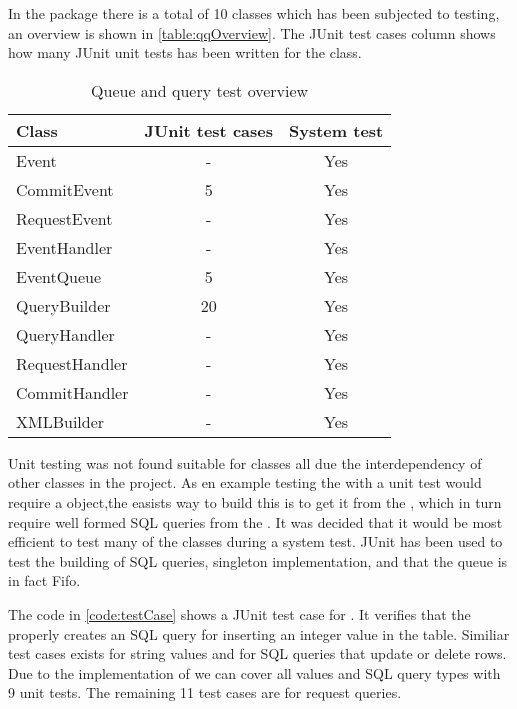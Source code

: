 In the  package there is a total of 10 classes which has been subjected to testing, an overview is shown in \autoref{table:qqOverview}.
The JUnit test cases column shows how many JUnit unit tests has been written for the class.

\begin{table}[H]
  \begin{center}
  \begin{tabular}{l|c|c}
    Class          & JUnit test cases & System test\\
\hline
    Event          & -                &Yes\\
    CommitEvent    & 5                &Yes\\
    RequestEvent   & -                &Yes\\
    EventHandler   & -                &Yes\\
    EventQueue     & 5                &Yes\\
    QueryBuilder   & 20               &Yes\\
    QueryHandler   & -                &Yes\\
    RequestHandler & -                &Yes\\
    CommitHandler  & -                &Yes\\
    XMLBuilder     & -                &Yes\\
  \end{tabular}
  \caption{Queue and query test overview}
  \label{table:qqOverview}
  \end{center}
\end{table}

Unit testing was not found suitable for classes all due the interdependency of other classes in the project. As en example testing the  with a unit test would require
a  object,the easists way to build this is to get it from the , which in turn require well formed SQL queries from the .
It was decided that it would be most efficient to test many of the classes during a system test. JUnit has been used to test the building of SQL queries, singleton implementation,
and that the queue is in fact Fifo. 

The code in \autoref{code:testCase} shows a JUnit test case for . It verifies that the  properly creates an SQL query for inserting an integer value
in the  table. Similiar test cases exists for string values and for SQL queries that update or delete rows.
Due to the implementation of  we can cover all values and SQL query types with 9 unit tests. The remaining 11 test cases are for request queries.

